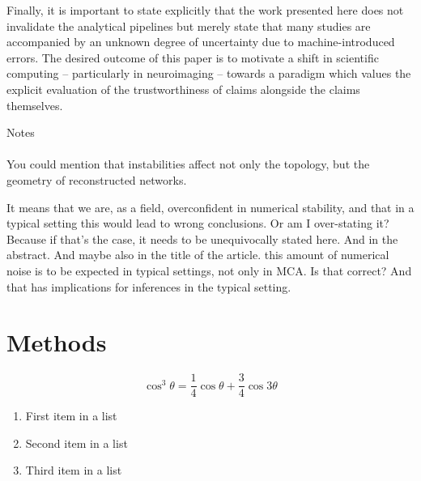 \documentclass[fleqn,10pt]{SelfArx} %
\begin{document}
Finally, it is important to state explicitly that the work presented here does not invalidate the analytical pipelines but merely state that many studies are accompanied by an unknown degree of uncertainty due to machine-introduced errors. The desired outcome of this paper is to motivate a shift in scientific computing – particularly in neuroimaging – towards a paradigm which values the explicit evaluation of the trustworthiness of claims alongside the claims themselves.

{\color{orange}Notes\\\\
You could mention that instabilities affect not only the topology, but the geometry of reconstructed networks.

It means that we are, as a field, overconfident in numerical stability, and that in a typical setting this would lead
to wrong conclusions. Or am I over-stating it? Because if that's the case, it needs to be unequivocally stated here.
And in the abstract. And maybe also in the title of the article. this amount of numerical noise is to be expected in
typical settings, not only in MCA. Is that correct? And that has implications for inferences in the typical setting.
}


{\footnotesize }

\section*{Methods}
\begin{equation}
\cos^3 \theta =\frac{1}{4}\cos\theta+\frac{3}{4}\cos 3\theta
\label{eq:refname2}
\end{equation}

\lipsum[10] %

\begin{enumerate}[noitemsep] %
\item First item in a list
\item Second item in a list
\item Third item in a list
\end{enumerate}

\lipsum[14] %
\end{document}
